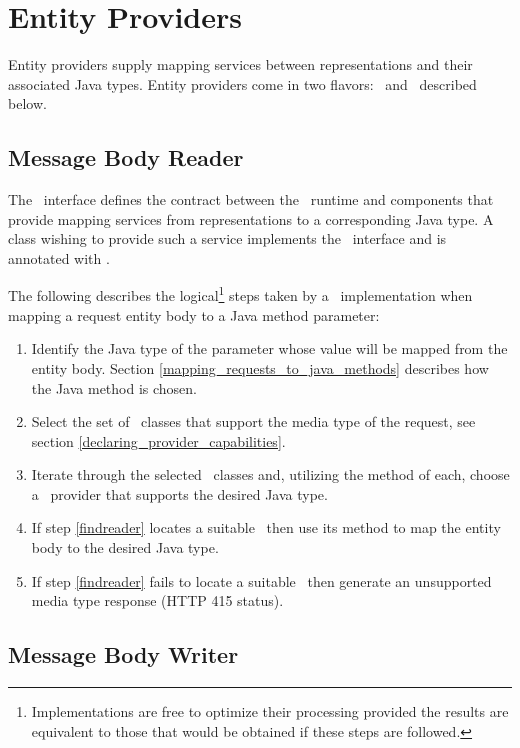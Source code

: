 \section{Entity Providers}
\label{entity_providers}

Entity providers supply mapping services between representations and their associated Java types. Entity providers come in two flavors: \MsgRead\ and \MsgWrite\ described below.

\subsection{Message Body Reader}
\label{message_body_reader}

The \MsgRead\ interface defines the contract between the \jaxrs\ runtime and components that provide mapping services from representations to a corresponding Java type. A class wishing to provide such a service implements the \MsgRead\ interface and is annotated with \Provider.

The following describes the logical\footnote{Implementations are free to optimize their processing provided the results are equivalent to those that would be obtained if these steps are followed.} steps taken by a \jaxrs\ implementation when mapping a request entity body to a Java method parameter:

\begin{enumerate}
\item Identify the Java type of the parameter whose value will be mapped from the entity body. Section \ref{mapping_requests_to_java_methods} describes how the Java method is chosen.
\item Select the set of \MsgRead\ classes that support the media type of the request, see section \ref{declaring_provider_capabilities}.
\item\label{findreader} Iterate through the selected \MsgRead\ classes and, utilizing the  method of each, choose a \MsgRead\ provider that supports the desired Java type.
\item If step \ref{findreader} locates a suitable \MsgRead\ then use its  method to map the entity body to the desired Java type.
\item If step \ref{findreader} fails to locate a suitable \MsgRead\ then generate an unsupported media type response (HTTP 415 status).
\end{enumerate}

\subsection{Message Body Writer}
\label{message_body_writer}

